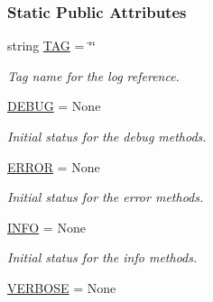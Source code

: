 \subsubsection*{Static Public Attributes}
\begin{DoxyCompactItemize}
\item 
\hypertarget{classlog_1_1_log_ab4f0e292f1ce1c1b605bac705770fe5e}{string \hyperlink{classlog_1_1_log_ab4f0e292f1ce1c1b605bac705770fe5e}{T\-A\-G} = \char`\"{}\char`\"{}}\label{classlog_1_1_log_ab4f0e292f1ce1c1b605bac705770fe5e}

\begin{DoxyCompactList}\small\item\em Tag name for the log reference. \end{DoxyCompactList}\item 
\hypertarget{classlog_1_1_log_aabaedecefd33c631631af7e1975de3d0}{\hyperlink{classlog_1_1_log_aabaedecefd33c631631af7e1975de3d0}{D\-E\-B\-U\-G} = None}\label{classlog_1_1_log_aabaedecefd33c631631af7e1975de3d0}

\begin{DoxyCompactList}\small\item\em Initial status for the debug methods. \end{DoxyCompactList}\item 
\hypertarget{classlog_1_1_log_a1c2beeec18874f0fbc150b4d16f3ff34}{\hyperlink{classlog_1_1_log_a1c2beeec18874f0fbc150b4d16f3ff34}{E\-R\-R\-O\-R} = None}\label{classlog_1_1_log_a1c2beeec18874f0fbc150b4d16f3ff34}

\begin{DoxyCompactList}\small\item\em Initial status for the error methods. \end{DoxyCompactList}\item 
\hypertarget{classlog_1_1_log_ab7d8cb4653723240b7c48948fb829e74}{\hyperlink{classlog_1_1_log_ab7d8cb4653723240b7c48948fb829e74}{I\-N\-F\-O} = None}\label{classlog_1_1_log_ab7d8cb4653723240b7c48948fb829e74}

\begin{DoxyCompactList}\small\item\em Initial status for the info methods. \end{DoxyCompactList}\item 
\hypertarget{classlog_1_1_log_a5d70df0379e33e60bb5a66eb79c72855}{\hyperlink{classlog_1_1_log_a5d70df0379e33e60bb5a66eb79c72855}{V\-E\-R\-B\-O\-S\-E} = None}\label{classlog_1_1_log_a5d70df0379e33e60bb5a66eb79c72855}


\end{DoxyCompactItemize}
